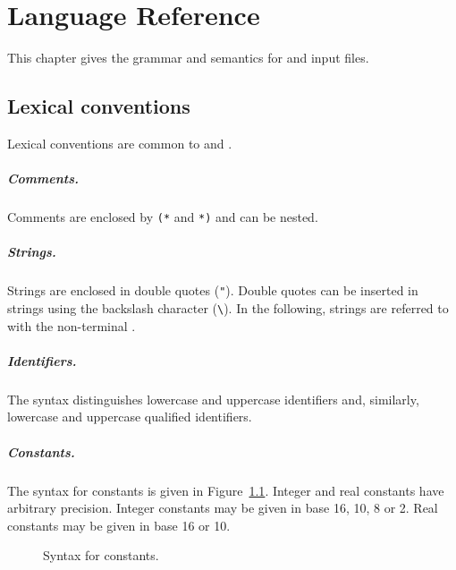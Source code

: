\chapter{Language Reference}
\label{chap:syntaxref}

This chapter gives the grammar and semantics for \why and \whyml input files.

\section{Lexical conventions}

Lexical conventions are common to \why and \whyml.


\paragraph{Comments.}
Comments are enclosed by \texttt{(*} and \texttt{*)} and can be nested.

\paragraph{Strings.}
Strings are enclosed in double quotes (\verb!"!). Double quotes can be
inserted in strings using the backslash character (\verb!\!).
In the following, strings are referred to with the non-terminal
.


\paragraph{Identifiers.} The syntax distinguishes lowercase and
uppercase identifiers and, similarly, lowercase and uppercase
qualified identifiers.

\begin{center}\framebox{}\end{center}

\paragraph{Constants.}
The syntax for constants is given in Figure~\ref{fig:bnf:constant}.
Integer and real constants have arbitrary precision.
Integer constants may be given in base 16, 10, 8 or 2.
Real constants may be given in base 16 or 10.

\begin{figure}
\begin{center}\framebox{}\end{center}
  \caption{Syntax for constants.}
\label{fig:bnf:constant}
\end{figure}

